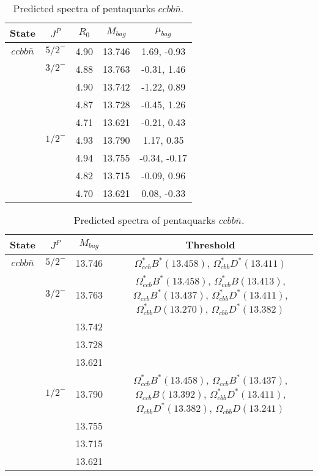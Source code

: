 \documentclass[prd,twocolumn,floatfix,nofootinbib]{revtex4}
\begin{document}
\renewcommand{\tabcolsep}{0.5cm}
\renewcommand{\arraystretch}{1.2}
\begin{table*}[!htbp]
    \caption{Predicted spectra of pentaquarks $ccbb\bar{n}$.}
    \begin{tabular}{ccccc}
        \hline\hline
        {\rm State} &$J^{P}$ &$R_{0}$ &$M_{bag}$ &$\mu_{bag}$ \\ \hline
        ${ccbb\bar{n}}$
            &${5/2}^{-}$    &4.90   &13.746 &1.69, -0.93 \\
            &${3/2}^{-}$    &4.88   &13.763 &-0.31, 1.46 \\
            &               &4.90   &13.742 &-1.22, 0.89 \\
            &               &4.87   &13.728 &-0.45, 1.26 \\
            &               &4.71   &13.621 &-0.21, 0.43 \\
            &${1/2}^{-}$    &4.93   &13.790 &1.17, 0.35 \\
            &               &4.94   &13.755 &-0.34, -0.17 \\
            &               &4.82   &13.715 &-0.09, 0.96 \\
            &               &4.70   &13.621 &0.08, -0.33 \\
        \hline\hline
    \end{tabular}
\end{table*}

\renewcommand{\tabcolsep}{0.5cm}
\renewcommand{\arraystretch}{1.2}
\begin{table*}[!htbp]
    \caption{Predicted spectra of pentaquarks $ccbb\bar{n}$.}
    \begin{tabular}{cccc}
        \hline\hline
        {\rm State} &$J^{P}$ &$M_{bag}$ &Threshold \\ \hline
        ${ccbb\bar{n}}$
            &${5/2}^{-}$    &13.746 &$\Omega^{\ast}_{ccb} B^{\ast}(13.458)$, $\Omega^{\ast}_{cbb} D^{\ast}(13.411)$ \\
            &${3/2}^{-}$    &13.763 &$\Omega^{\ast}_{ccb} B^{\ast}(13.458)$, $\Omega^{\ast}_{ccb} B(13.413)$, $\Omega_{ccb} B^{\ast}(13.437)$, $\Omega^{\ast}_{cbb} D^{\ast}(13.411)$, $\Omega^{\ast}_{cbb} D(13.270)$, $\Omega_{cbb} D^{\ast}(13.382)$ \\
            &               &13.742 & \\
            &               &13.728 & \\
            &               &13.621 & \\
            &${1/2}^{-}$    &13.790 &$\Omega^{\ast}_{ccb} B^{\ast}(13.458)$, $\Omega_{ccb} B^{\ast}(13.437)$, $\Omega_{ccb} B(13.392)$, $\Omega^{\ast}_{cbb} D^{\ast}(13.411)$, $\Omega_{cbb} D^{\ast}(13.382)$, $\Omega_{cbb} D(13.241)$ \\
            &               &13.755 & \\
            &               &13.715 & \\
            &               &13.621 & \\
        \hline\hline
    \end{tabular}
\end{table*}
\end{document}
